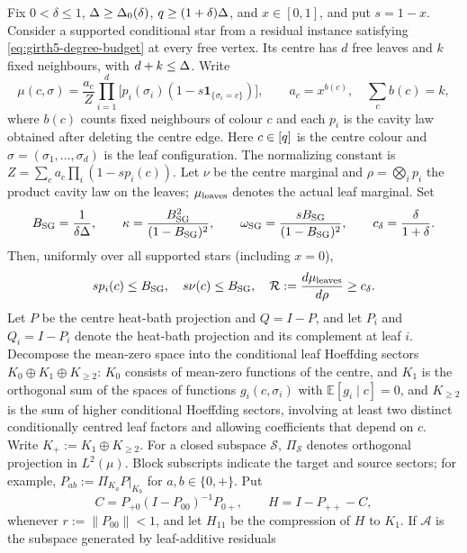 \begin{lemma}
\label{lem:girth5-star-bounds}
Fix $0<\delta\leq1$, $\Delta\geq\Delta_0(\delta)$,
$q\ge(1+\delta)\Delta$, and $x\in[0,1]$, and put
$s=1-x$.  Consider a supported conditional star from a residual instance
satisfying \eqref{eq:girth5-degree-budget} at every free vertex.  Its centre
has $d$ free leaves and $k$ fixed neighbours, with $d+k\leq\Delta$.  Write
\[
 \mu(c,\sigma)=\frac{a_c}{Z}\prod_{i=1}^{d}
 \bigl[p_i(\sigma_i)(1-s\mathbf1_{\{\sigma_i=c\}})\bigr],
 \qquad a_c=x^{b(c)},\quad \sum_cb(c)=k,
\]
where $b(c)$ counts fixed neighbours of colour $c$ and each $p_i$ is
the cavity law obtained after deleting the centre edge.
Here $c\in[q]$ is the centre colour and
$\sigma=(\sigma_1,\ldots,\sigma_d)$ is the leaf configuration.  The
normalizing constant is $Z=\sum_c a_c\prod_i(1-sp_i(c))$.
Let $\nu$ be the centre marginal and $\rho=\bigotimes_i p_i$ the product
cavity law on the leaves; $\mu_{\rm leaves}$ denotes the actual leaf
marginal.  Set
\[
 B_{\rm SG}=\frac{1}{\delta\Delta},\qquad
 \kappa=\frac{B_{\rm SG}^2}{(1-B_{\rm SG})^2},\qquad
 \omega_{\rm SG}=\frac{sB_{\rm SG}}{(1-B_{\rm SG})^2},\qquad c_\delta=\frac{\delta}{1+\delta}.
\]
Then, uniformly over all supported stars (including $x=0$),
\begin{equation}\label{eq:sg-star-density}
 s p_i(c)\le B_{\rm SG},\quad s\nu(c)\le B_{\rm SG},\quad
 \mathcal R:=\frac{d\mu_{\rm leaves}}{d\rho}\ge c_\delta.
\end{equation}
Let $P$ be the centre heat-bath projection and $Q=I-P$, and let
$P_i$ and $Q_i=I-P_i$ denote the heat-bath projection and its complement at
leaf $i$.  Decompose the mean-zero space into the conditional leaf Hoeffding
sectors $K_0\oplus K_1\oplus K_{\ge2}$: $K_0$ consists of mean-zero
functions of the centre, and $K_1$ is the orthogonal sum of the spaces of functions
$g_i(c,\sigma_i)$ with $\mathbb E[g_i\mid c]=0$, and $K_{\ge2}$ is the
sum of higher conditional Hoeffding sectors, involving at least two
distinct conditionally centred leaf factors and allowing coefficients
that depend on $c$.
Write $K_+:=K_1\oplus K_{\ge2}$.  For a closed subspace $\mathcal S$,
$\Pi_{\mathcal S}$ denotes orthogonal projection in $L^2(\mu)$.
Block subscripts indicate the target and source sectors; for example,
$P_{ab}:=\Pi_{K_a}P|_{K_b}$ for $a,b\in\{0,+\}$.  Put
\[
 C=P_{+0}(I-P_{00})^{-1}P_{0+},\qquad H=I-P_{++}-C,
\]
whenever $r:=\|P_{00}\|<1$, and let $H_{11}$ be the compression of $H$
to $K_1$.  If $\mathcal A$ is the subspace generated by
leaf-additive residuals

\end{lemma}
